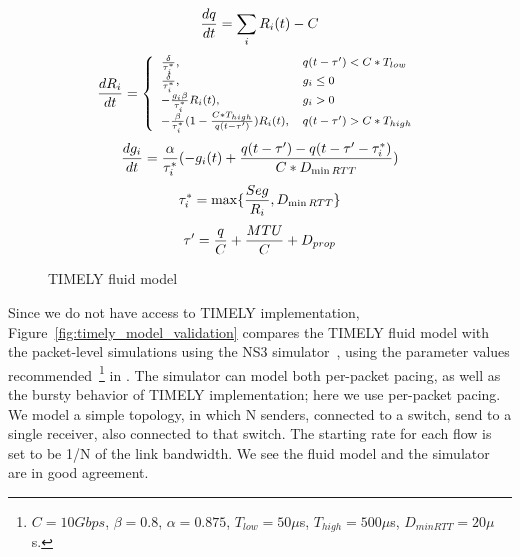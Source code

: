 \begin{figure}[h]
\fbox
{
\begin{minipage}{\columnwidth}
\begin{equation}
\small
\frac{{dq}}{{dt}} = \sum_{i} R_i(t) - C\\
\label{eq:timely_q}
\end{equation}
\begin{equation}
\small
\frac{{dR_i}}{{dt}} = \left\{ \begin{array}{ll}
\frac{\delta }{{\tau_i^*}}, & q(t - \tau ') < C*{T_{low}}\\
\frac{\delta }{{\tau_i^*}}, & g_i \le 0\\
 - \frac{{g_i\beta }}{{\tau_i^*}}R_i(t), & g_i > 0\\
 - \frac{\beta }{{\tau_i^*}}(1 - \frac{{C*{T_{high}}}}{{q(t - \tau ')}})R_i(t), & q(t - \tau ') > C*{T_{high}}
\end{array} \right.\\
\label{eq:timely_r}
\end{equation}
\begin{equation}
\small
\frac{{dg_i}}{{dt}} = \frac{\alpha }{{\tau_i^*}}( - g_i(t) + \frac{{q(t - \tau ') - q(t - \tau ' - \tau_i^*)}}{{C*{D_{\min RTT}}}})\\
\label{eq:timely_g}
\end{equation}
\begin{equation}
\small
\tau_i^* = \max \{ \frac{{Seg}}{R_i},{D_{\min RTT}}\} \\
\label{eq:timely_taus}
\end{equation}
\begin{equation}
\small
\tau ' = \frac{q}{C} + \frac{{MTU}}{C} + {D_{prop}}
\label{eq:timely_taup}
\end{equation}
\end{minipage}
}
\caption{TIMELY fluid model}
\label{fig:timely_model}
\end{figure}

Since we do not have access to TIMELY implementation,
Figure~\ref{fig:timely_model_validation} compares the TIMELY fluid model with
the packet-level simulations using the NS3 simulator~\cite{ns3}, using the
parameter values recommended~\footnote{$C=10Gbps$, $\beta=0.8$, $\alpha=0.875$,
$T_{low} = 50\mu$s, $T_{high} = 500\mu$s, $D_{minRTT}= 20 \mu$s.} in
\cite{timely}. The simulator can model both per-packet pacing, as well as the
bursty behavior of TIMELY implementation; here we use per-packet pacing. We
model a simple topology, in which N senders, connected to a switch, send to a
single receiver, also connected to that switch. The starting rate for each flow
is set to be 1/N of the link bandwidth. We see the fluid model and the simulator
are in good agreement.

